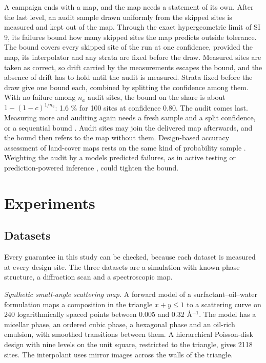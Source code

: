 \documentclass{iopjournal}
\begin{document}
A campaign ends with a map, and the map needs a statement of its own. After the last level, an audit sample drawn uniformly from the skipped sites is measured and kept out of the map. Through the exact hypergeometric limit of SI 9, its failures bound how many skipped sites the map predicts outside tolerance. The bound covers every skipped site of the run at one confidence, provided the map, its interpolator and any strata are fixed before the draw. Measured sites are taken as correct, so drift carried by the measurements escapes the bound, and the absence of drift has to hold until the audit is measured. Strata fixed before the draw give one bound each, combined by splitting the confidence among them. With no failure among \(n_a\) audit sites, the bound on the share is about \(1 - (1 - c)^{1/n_a}\): 1.6 \% for 100 sites at confidence 0.80. The audit comes last. Measuring more and auditing again needs a fresh sample and a split confidence, or a sequential bound \cite{WaudbySmith2020}. Audit sites may join the delivered map afterwards, and the bound then refers to the map without them. Design-based accuracy assessment of land-cover maps rests on the same kind of probability sample \cite{Olofsson2014}. Weighting the audit by a model\textquotesingle s predicted failures, as in active testing \cite{Kossen2021} or prediction-powered inference \cite{AngelopoulosPPI2023}, could tighten the bound.

\hypertarget{sec:4}{%
\section{Experiments}\label{sec:4}}

\hypertarget{sec:4-1}{%
\subsection{Datasets}\label{sec:4-1}}

Every guarantee in this study can be checked, because each dataset is measured at every design site. The three datasets are a simulation with known phase structure, a diffraction scan and a spectroscopic map.

\emph{Synthetic small-angle scattering map.} A forward model of a surfactant--oil--water formulation maps a composition in the triangle \(x + y \le 1\) to a scattering curve on 240 logarithmically spaced points between 0.005 and 0.32 \AA{}\ensuremath{^{-1}}. The model has a micellar phase, an ordered cubic phase, a hexagonal phase and an oil-rich emulsion, with smoothed transitions between them. A hierarchical Poisson-disk design with nine levels on the unit square, restricted to the triangle, gives 2118 sites. The interpolant uses mirror images across the walls of the triangle.
\end{document}
